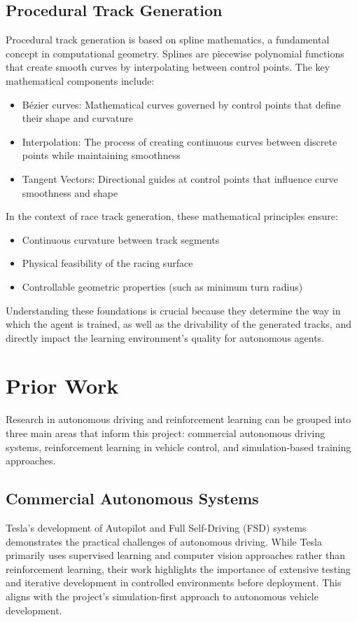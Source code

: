 \documentclass[10pt,twocolumn]{article}
\begin{document}
\subsection{Procedural Track Generation}
Procedural track generation is based on spline mathematics, a fundamental concept in computational geometry. Splines are piecewise polynomial functions that create smooth curves by interpolating between control points. The key mathematical components include:
\begin{itemize}
    \item Bézier curves: Mathematical curves governed by control points that define their shape and curvature
    \item Interpolation: The process of creating continuous curves between discrete points while maintaining smoothness
    \item Tangent Vectors: Directional guides at control points that influence curve smoothness and shape
\end{itemize}
In the context of race track generation, these mathematical principles ensure:
\begin{itemize}
    \item Continuous curvature between track segments
    \item Physical feasibility of the racing surface
    \item Controllable geometric properties (such as minimum turn radius)
\end{itemize}

Understanding these foundations is crucial because they determine the way in which the agent is trained, as well as the drivability of the generated tracks, and directly impact the learning environment's quality for autonomous agents.

\section{Prior Work}
Research in autonomous driving and reinforcement learning can be grouped into three main areas that inform this project: commercial autonomous driving systems, reinforcement learning in vehicle control, and simulation-based training approaches.
\subsection{Commercial Autonomous Systems}
Tesla's development of Autopilot and Full Self-Driving (FSD) systems demonstrates the practical challenges of autonomous driving. While Tesla primarily uses supervised learning and computer vision approaches rather than reinforcement learning, their work highlights the importance of extensive testing and iterative development in controlled environments before deployment. This aligns with the project's simulation-first approach to autonomous vehicle development.
\end{document}

